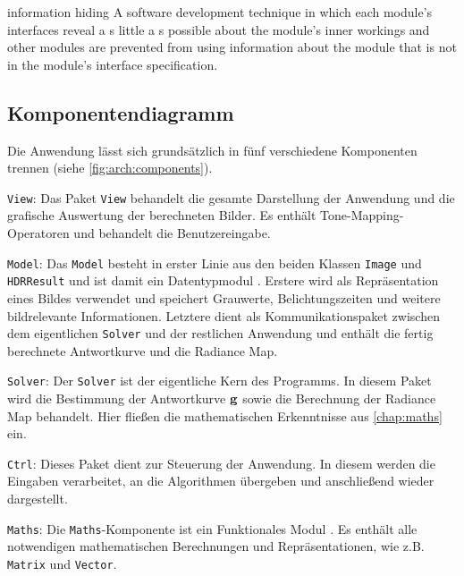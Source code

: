 \begin{ieee}{information hiding}
A software development technique in which each module's interfaces reveal a s little a s possible about the module's inner workings and other modules are prevented from using information about the module that is not in the module's interface specification.
\end{ieee}

\subsection{Komponentendiagramm}
Die Anwendung lässt sich grundsätzlich in fünf verschiedene Komponenten trennen (siehe \autoref{fig:arch:components}). 
\begin{description}

\item{\texttt{View}:} Das Paket \texttt{View} behandelt die gesamte Darstellung der Anwendung und die grafische Auswertung der berechneten Bilder. Es enthält \gls{Tone-Mapping}-Operatoren und behandelt die Benutzereingabe.

\item{\texttt{Model}:} Das \texttt{Model} besteht in erster Linie aus den beiden Klassen \texttt{Image} und \texttt{HDRResult} und ist damit ein Datentypmodul \cite[S. 412]{ludewig}. Erstere wird als Repräsentation eines Bildes verwendet und speichert Grauwerte, Belichtungszeiten und weitere bildrelevante Informationen. Letztere dient als Kommunikationspaket zwischen dem eigentlichen \texttt{Solver} und der restlichen Anwendung und enthält die fertig berechnete Antwortkurve und die \gls{Radiance Map}.

\item{\texttt{Solver}:} Der \texttt{Solver} ist der eigentliche Kern des Programms. In diesem Paket wird die Bestimmung der Antwortkurve $\mathbf g$ sowie die Berechnung der \gls{Radiance Map} behandelt. Hier fließen die mathematischen Erkenntnisse aus \autoref{chap:maths} ein.

\item{\texttt{Ctrl}:} Dieses Paket dient zur Steuerung der Anwendung. In diesem werden die Eingaben verarbeitet, an die Algorithmen übergeben und anschließend wieder dargestellt.

\item{\texttt{Maths}:} Die \texttt{Maths}-Komponente ist ein Funktionales Modul \cite[S. 412]{ludewig}. Es enthält alle notwendigen mathematischen Berechnungen und Repräsentationen, wie z.B. \texttt{Matrix} und \texttt{Vector}.
\end{description}


